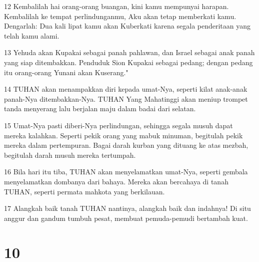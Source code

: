 \par 12 Kembalilah hai orang-orang buangan, kini kamu mempunyai harapan. Kembalilah ke tempat perlindunganmu, Aku akan tetap memberkati kamu. Dengarlah: Dua kali lipat kamu akan Kuberkati karena segala penderitaan yang telah kamu alami.
\par 13 Yehuda akan Kupakai sebagai panah pahlawan, dan Israel sebagai anak panah yang siap ditembakkan. Penduduk Sion Kupakai sebagai pedang; dengan pedang itu orang-orang Yunani akan Kuserang."
\par 14 TUHAN akan menampakkan diri kepada umat-Nya, seperti kilat anak-anak panah-Nya ditembakkan-Nya. TUHAN Yang Mahatinggi akan meniup trompet tanda menyerang lalu berjalan maju dalam badai dari selatan.
\par 15 Umat-Nya pasti diberi-Nya perlindungan, sehingga segala musuh dapat mereka kalahkan. Seperti pekik orang yang mabuk minuman, begitulah pekik mereka dalam pertempuran. Bagai darah kurban yang dituang ke atas mezbah, begitulah darah musuh mereka tertumpah.
\par 16 Bila hari itu tiba, TUHAN akan menyelamatkan umat-Nya, seperti gembala menyelamatkan dombanya dari bahaya. Mereka akan bercahaya di tanah TUHAN, seperti permata mahkota yang berkilauan.
\par 17 Alangkah baik tanah TUHAN nantinya, alangkah baik dan indahnya! Di situ anggur dan gandum tumbuh pesat, membuat pemuda-pemudi bertambah kuat.

\chapter{10}

